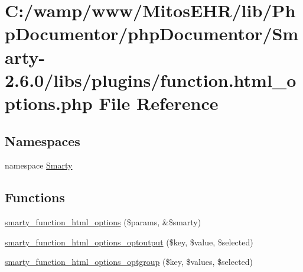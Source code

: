 \hypertarget{function_8html__options_8php}{\section{\-C\-:/wamp/www/\-Mitos\-E\-H\-R/lib/\-Php\-Documentor/php\-Documentor/\-Smarty-\/2.6.0/libs/plugins/function.html\-\_\-options.\-php \-File \-Reference}
\label{function_8html__options_8php}
}
\subsection*{\-Namespaces}
\begin{DoxyCompactItemize}
\item 
namespace \hyperlink{namespace_smarty}{\-Smarty}
\end{DoxyCompactItemize}
\subsection*{\-Functions}
\begin{DoxyCompactItemize}
\item 
\hyperlink{function_8html__options_8php_aa5e18ee3d2997b62ce20c9f9b6ec342b}{smarty\-\_\-function\-\_\-html\-\_\-options} (\$params, \&\$smarty)
\item 
\hyperlink{function_8html__options_8php_a586af13d7fee785275ac9cebaf083670}{smarty\-\_\-function\-\_\-html\-\_\-options\-\_\-optoutput} (\$key, \$value, \$selected)
\item 
\hyperlink{function_8html__options_8php_a89bd11f6d60fc1ef8e083fd31656d6c8}{smarty\-\_\-function\-\_\-html\-\_\-options\-\_\-optgroup} (\$key, \$values, \$selected)
\end{DoxyCompactItemize}


